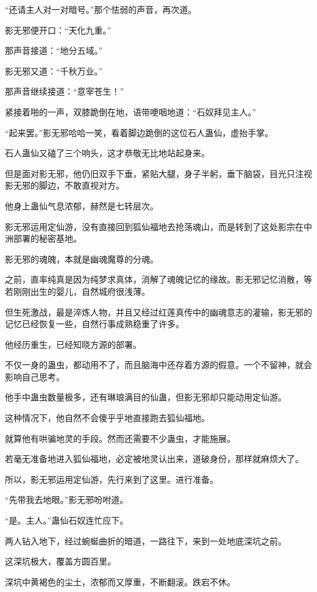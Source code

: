 
\begin{this_body}

“还请主人对一对暗号。”那个怯弱的声音，再次道。

影无邪便开口：“天化九重。”

那声音接道：“地分五域。”

影无邪又道：“千秋万业。”

那声音继续接道：“意宰苍生！”

紧接着啪的一声，双膝跪倒在地，语带哽咽地道：“石奴拜见主人。”

“起来罢。”影无邪哈哈一笑，看着脚边跪倒的这位石人蛊仙，虚抬手掌。

石人蛊仙又磕了三个响头，这才恭敬无比地站起身来。

但是面对影无邪，他仍旧双手下垂，紧贴大腿，身子半躬，垂下脑袋，目光只注视影无邪的脚边，不敢直视对方。

他身上蛊仙气息浓郁，赫然是七转层次。

影无邪运用定仙游，没有直接回到狐仙福地去抢荡魂山，而是转到了这处影宗在中洲部署的秘密基地。

影无邪的魂魄，本就是幽魂魔尊的分魂。

之前，直率纯真是因为纯梦求真体，消解了魂魄记忆的缘故。影无邪记忆消散，等若刚刚出生的婴儿，自然城府很浅薄。

但生死激战，最是淬炼人物，并且又经过红莲真传中的幽魂意志的灌输，影无邪的记忆已经恢复一些，自然行事成熟稳重了许多。

他经历重生，已经知晓方源的部署。

不仅一身的蛊虫，都动用不了，而且脑海中还存着方源的假意。一个不留神，就会影响自己思考。

他手中蛊虫数量极多，还有琳琅满目的仙蛊，但影无邪却只能动用定仙游。

这种情况下，他自然不会傻乎乎地直接跑去狐仙福地。

就算他有哄骗地灵的手段。然而还需要不少蛊虫，才能施展。

若毫无准备地进入狐仙福地，必定被地灵认出来，道破身份，那样就麻烦大了。

所以，影无邪运用定仙游，先行来到了这里。进行准备。

“先带我去地眼。”影无邪吩咐道。

“是。主人。”蛊仙石奴连忙应下。

两人钻入地下，经过蜿蜒曲折的暗道，一路往下，来到一处地底深坑之前。

这深坑极大，覆盖方圆百里。

深坑中黄褐色的尘土，浓郁而又厚重，不断翻滚。跌宕不休。


\end{this_body}

